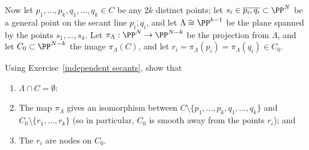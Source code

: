 Now let $p_1,\dots,p_k, q_1,\dots, q_k \in C$ be any $2k$ distinct points; let $s_i \in \overline{p_i,q_i} \subset \PP^N$ be a general point on the secant line $\overline{p_i,q_i} $, and let $\Lambda \cong \PP^{k-1}$ be the plane spanned by the points $s_1,\dots,s_k$. Let $\pi_\Lambda : \PP^N \to \PP^{N-k}$ be the projection from $\Lambda$, and let $C_0 \subset \PP^{N-k}$ the image $\pi_\Lambda(C)$, and let $r_i = \pi_\Lambda(p_i) = \pi_\Lambda(q_i) \in C_0$.

\begin{exercise}\label{construction of nodal curves}
Using Exercise~\ref{independent secants}, show that 
\begin{enumerate}
\item $\Lambda \cap C = \emptyset$:
\item The map $\pi_\Lambda$ gives an isomorphism between $C \setminus \{p_1,\dots,p_k, q_1,\dots, q_k\}$ and $C_0 \setminus \{r_1,\dots,r_k\}$ (so in particular, $C_0$ is smooth away from the points $r_i$); and
\item The $r_i$ are nodes on $C_0$.
\end{enumerate}
\end{exercise}

%

